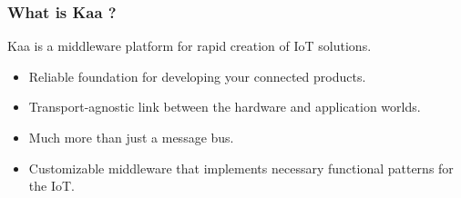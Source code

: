 \documentclass{beamer}
\begin{document}
\begin{frame}
	\frametitle{What is Kaa ?}
	\centering Kaa is a middleware platform for rapid creation of IoT solutions.
	\vspace{1cm}
	\begin{itemize}
		\item Reliable foundation for developing your connected products.
		\item \textcolor{TextGreen}{Transport-agnostic} link between the hardware and application worlds.
		\item Much more than just a message bus.
		\item \textcolor{TextOrange}{Customizable} middleware that implements necessary functional patterns for the IoT.
	\end{itemize}
\end{frame}
\end{document}
